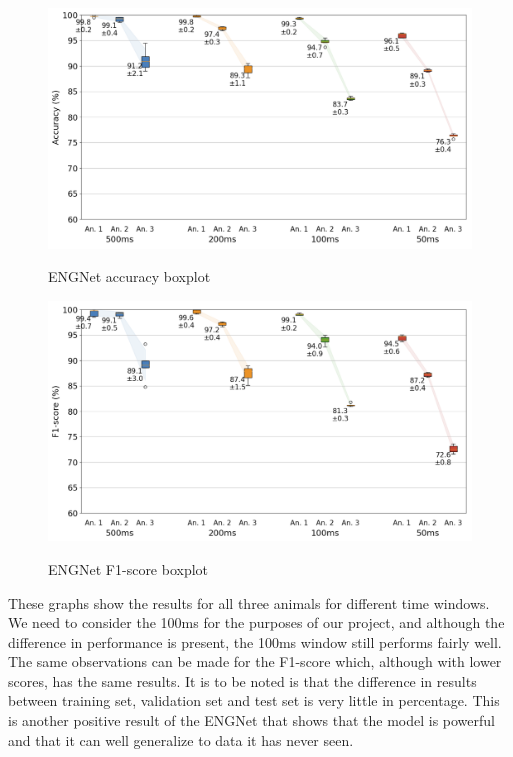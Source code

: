 \documentclass{Configuration_Files/PoliMi3i_thesis}
\begin{document}
\begin{figure}[H]
	\includegraphics[scale=0.5]{engNet_accuracy.png}
	\centering
    \label{engNet_params_5}
    \caption{ENGNet accuracy boxplot}
	\end{figure}
	
	\begin{figure}[H]
		\includegraphics[scale=0.5]{engNet_f1score.png}
		\centering
        \label{engNet_params_6}
        \caption{ENGNet F1-score boxplot}
		\end{figure}

These graphs show the results for all three animals for different time windows.
We need to consider the 100ms for the purposes of our project, and although the difference in performance is present, the 100ms window still performs fairly well.
The same observations can be made for the F1-score which, although with lower scores, has the same results.
It is to be noted is that the difference in results between training set, validation set and test set is very little in percentage.
This is another positive result of the ENGNet that shows that the model is powerful and that it can well generalize to data it has never seen.
\end{document}
